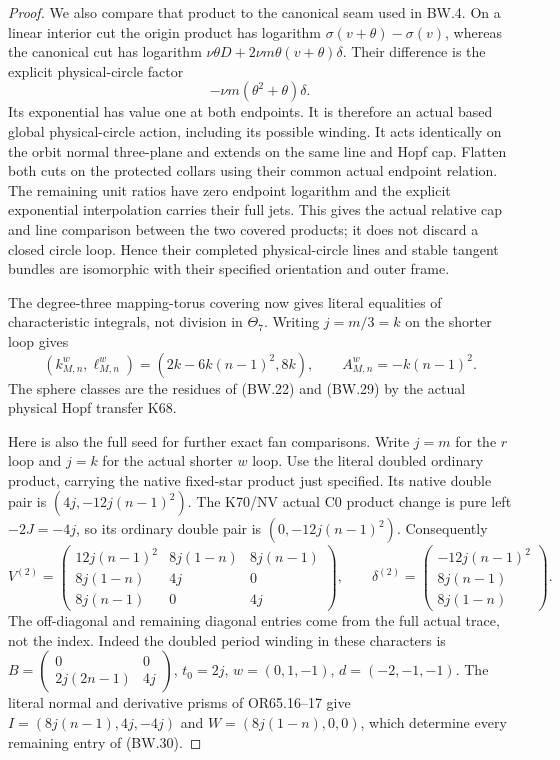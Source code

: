 \begin{proof}
We also compare that product to the canonical seam used in
BW.4. On a linear interior cut the origin product has
logarithm \(\sigma(v+\theta)-\sigma(v)\), whereas the
canonical cut has logarithm
\(\nu\theta D+2\nu m\theta(v+\theta)\delta\).
Their difference is the explicit physical-circle factor
\[
                 -\nu m(\theta^2+\theta)\delta.
                                                        \tag{BW.28}
\]
Its exponential has value one at both endpoints. It is
therefore an actual based global physical-circle action,
including its possible winding. It acts identically on the
orbit normal three-plane and extends on the same line and
Hopf cap. Flatten both cuts on the protected collars using
their common actual endpoint relation. The remaining unit
ratios have zero endpoint logarithm and the explicit
exponential interpolation carries their full jets. This
gives the actual relative cap and line comparison between
the two covered products; it does not discard a closed
circle loop. Hence their completed physical-circle lines
and stable tangent bundles are isomorphic with their
specified orientation and outer frame.

The degree-three mapping-torus covering now gives literal
equalities of characteristic integrals, not division in
\(\Theta_7\). Writing \(j=m/3=k\) on the shorter loop gives
\[
 (k_{M,n}^{w},\ell_{M,n}^{w})
       =(2k-6k(n-1)^2,8k),\qquad
 A_{M,n}^{w}=-k(n-1)^2.                              \tag{BW.29}
\]
The sphere classes are the residues of (BW.22) and (BW.29)
by the actual physical Hopf transfer K68.

Here is also the full seed for further exact fan comparisons.
Write \(j=m\) for the \(r\) loop and \(j=k\) for the actual shorter
\(w\) loop. Use the literal doubled ordinary product, carrying
the native fixed-star product just specified. Its native
double pair is \((4j,-12j(n-1)^2)\). The K70/NV actual C0
product change is pure left \(-2J=-4j\), so its ordinary
double pair is \((0,-12j(n-1)^2)\). Consequently
\[
 V^{(2)}=\begin{pmatrix}
 12j(n-1)^2&8j(1-n)&8j(n-1)\\
 8j(1-n)&4j&0\\8j(n-1)&0&4j
 \end{pmatrix},\qquad
 \delta^{(2)}=\begin{pmatrix}
 -12j(n-1)^2\\8j(n-1)\\8j(1-n)
 \end{pmatrix}.                                    \tag{BW.30}
\]
The off-diagonal and remaining diagonal entries come from
the full actual trace, not the index. Indeed the doubled
period winding in these characters is
\(B=\left(\begin{smallmatrix}0&0\\2j(2n-1)&4j\end{smallmatrix}\right)\),
\(t_0=2j\), \(w=(0,1,-1)\), \(d=(-2,-1,-1)\). The literal
normal and derivative prisms of OR65.16--17 give
\(I=(8j(n-1),4j,-4j)\) and \(W=(8j(1-n),0,0)\), which
determine every remaining entry of (BW.30).


\end{proof}
